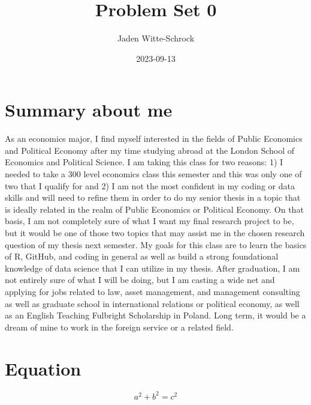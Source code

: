 \documentclass{article}
\title{Problem Set 0}
\author{Jaden Witte-Schrock}
\date{2023-09-13}
\begin{document}
\maketitle

\section{Summary about me}
As an economics major, I find myself interested in the fields of Public Economics and Political Economy after my time studying abroad at the London School of Economics and Political Science. I am taking this class for two reasons: 1) I needed to take a 300 level economics class this semester and this was only one of two that I qualify for and 2) I am not the most confident in my coding or data skills and will need to refine them in order to do my senior thesis in a topic that is ideally related in the realm of Public Economics or Political Economy. On that basis, I am not completely sure of what I want my final research project to be, but it would be one of those two topics that may assist me in the chosen research question of my thesis next semester. My goals for this class are to learn the basics of R, GitHub, and coding in general as well as build a strong foundational knowledge of data science that I can utilize in my thesis. After graduation, I am not entirely sure of what I will be doing, but I am casting a wide net and applying for jobs related to law, asset management, and management consulting as well as graduate school in international relations or political economy, as well as an English Teaching Fulbright Scholarship in Poland. Long term, it would be a dream of mine to work in the foreign service or a related field. 

\section{Equation}
\[ a^2 + b^2 = c^2 \]
\end{document}
